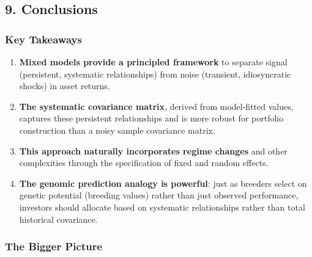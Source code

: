 \documentclass[
]{article}
\newenvironment{Shaded}{\begin{snugshade}}{\end{snugshade}}
\newcommand{\AttributeTok}[1]{\textcolor[rgb]{0.13,0.29,0.53}{#1}}
\newcommand{\CommentTok}[1]{\textcolor[rgb]{0.56,0.35,0.01}{\textit{#1}}}
\newcommand{\FunctionTok}[1]{\textcolor[rgb]{0.13,0.29,0.53}{\textbf{#1}}}
\newcommand{\NormalTok}[1]{#1}
\newcommand{\OtherTok}[1]{\textcolor[rgb]{0.56,0.35,0.01}{#1}}
\newcommand{\SpecialCharTok}[1]{\textcolor[rgb]{0.81,0.36,0.00}{\textbf{#1}}}
\providecommand{\tightlist}{%
  \setlength{\itemsep}{0pt}\setlength{\parskip}{0pt}}
\begin{document}
\begin{Shaded}
\end{Shaded}

\subsection{9. Conclusions}\label{conclusions}

\subsubsection{Key Takeaways}\label{key-takeaways}

\begin{enumerate}
\def\labelenumi{\arabic{enumi}.}
\tightlist
\item
  \textbf{Mixed models provide a principled framework} to separate
  signal (persistent, systematic relationships) from noise (transient,
  idiosyncratic shocks) in asset returns.
\item
  \textbf{The systematic covariance matrix}, derived from model-fitted
  values, captures these persistent relationships and is more robust for
  portfolio construction than a noisy sample covariance matrix.
\item
  \textbf{This approach naturally incorporates regime changes} and other
  complexities through the specification of fixed and random effects.
\item
  \textbf{The genomic prediction analogy is powerful}: just as breeders
  select on genetic potential (breeding values) rather than just
  observed performance, investors should allocate based on systematic
  relationships rather than total historical covariance.
\end{enumerate}

\subsubsection{The Bigger Picture}\label{the-bigger-picture}
\end{document}
